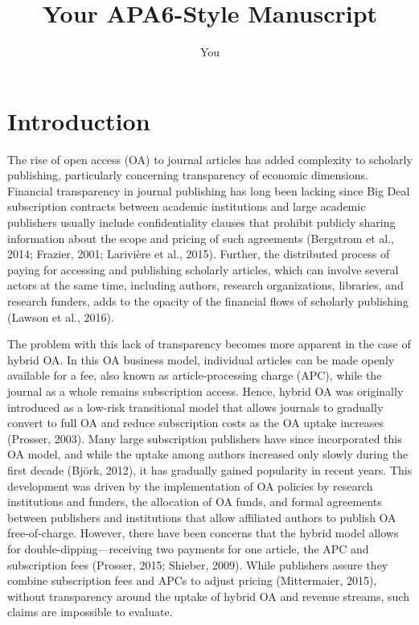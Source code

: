 \documentclass[a4paper,man,floatsintext,longtable,noextraspace,12pt]{apa6}
\title{Your APA6-Style Manuscript}
\author{You}
\affiliation{Somewhere}
\begin{document}
\hypertarget{introduction}{%
\section{Introduction}\label{introduction}}

The rise of open access (OA) to journal articles has added complexity to
scholarly publishing, particularly concerning transparency of economic
dimensions. Financial transparency in journal publishing has long been
lacking since Big Deal subscription contracts between academic
institutions and large academic publishers usually include
confidentiality clauses that prohibit publicly sharing information about
the scope and pricing of such agreements (Bergstrom et al., 2014;
Frazier, 2001; Larivière et al., 2015). Further, the distributed process
of paying for accessing and publishing scholarly articles, which can
involve several actors at the same time, including authors, research
organizations, libraries, and research funders, adds to the opacity of
the financial flows of scholarly publishing (Lawson et al., 2016).

The problem with this lack of transparency becomes more apparent in the
case of hybrid OA. In this OA business model, individual articles can be
made openly available for a fee, also known as article-processing charge
(APC), while the journal as a whole remains subscription access. Hence,
hybrid OA was originally introduced as a low-risk transitional model
that allows journals to gradually convert to full OA and reduce
subscription costs as the OA uptake increases (Prosser, 2003). Many
large subscription publishers have since incorporated this OA model, and
while the uptake among authors increased only slowly during the first
decade (Björk, 2012), it has gradually gained popularity in recent
years. This development was driven by the implementation of OA policies
by research institutions and funders, the allocation of OA funds, and
formal agreements between publishers and institutions that allow
affiliated authors to publish OA free-of-charge. However, there have
been concerns that the hybrid model allows for
double-dipping---receiving two payments for one article, the APC and
subscription fees (Prosser, 2015; Shieber, 2009). While publishers
assure they combine subscription fees and APCs to adjust pricing
(Mittermaier, 2015), without transparency around the uptake of hybrid OA
and revenue streams, such claims are impossible to evaluate.
\end{document}
